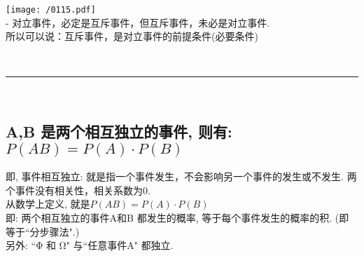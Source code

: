 \documentclass[UTF8]{ctexart}
\begin{document}
	\texttt{[image: /0115.pdf]} \\
	
	
	
	- 对立事件，必定是互斥事件，但互斥事件，未必是对立事件. \\
	所以可以说：互斥事件，是对立事件的前提条件(必要条件)
	
	
	
	~\\
	\hrule
	~\\
	
	\subsection{A,B 是两个相互独立的事件, 则有: $P(AB)= P(A) \cdot P(B)$}
	
	即, 事件相互独立: 就是指一个事件发生，不会影响另一个事件的发生或不发生. 两个事件没有相关性，相关系数为0. \\
	从数学上定义, 就是$ P(AB)=P(A) \cdot P(B)$ \\
	即: 两个相互独立的事件A和B 都发生的概率, 等于每个事件发生的概率的积. (即等于``分步骤法".) \\
	
	另外:  ``Φ 和 Ω" 与``任意事件A" 都独立. \\
	
\end{document}
